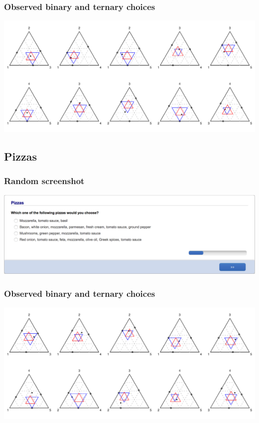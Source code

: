 \documentclass[11pt,letter]{article}
\begin{document}
\subsubsection*{Observed binary and ternary choices}

\includegraphics[width=15cm]{./Population_study_data/Simplexes/Star_pairs.pdf}

\pagebreak

\subsection*{Pizzas}



\subsubsection*{Random screenshot}

\includegraphics[width=15cm]{Population_study_design/screenshot_Pizzas.png}

\subsubsection*{Observed binary and ternary choices}

\includegraphics[width=15cm]{./Population_study_data/Simplexes/Pizzas.pdf}
\end{document}
